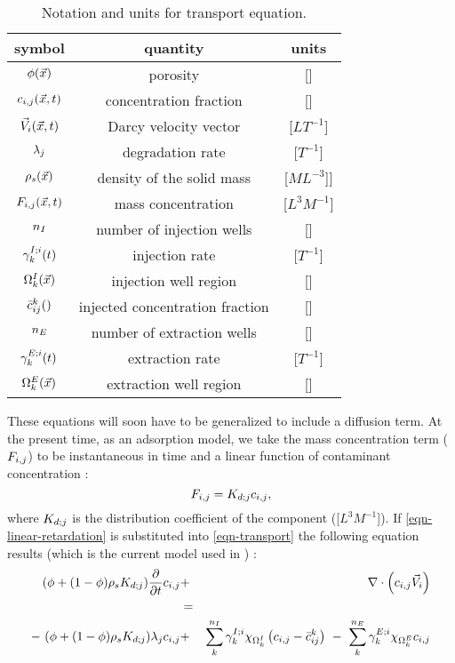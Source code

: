 \begin{table} \center
\caption{Notation and units for transport equation.}
\smallskip
\begin{tabular}{||c||c|c||}
\hline
symbol & quantity & units \\
\hline\hline
$\phi ({\vec x})$       & porosity                        & []               \\ \hline
$c_{i,j} ({\vec x},t)$     & concentration fraction          & []               \\ \hline
${\vec V}_i ({\vec x},t)$      & Darcy velocity vector           & [$L T^{-1}$]     \\ \hline
$\lambda_j$            & degradation rate                & [$T^{-1}$]       \\ \hline
$\rho_{s} ({\vec x})$  & density of the solid mass       & [$M L^{-3}$]]    \\ \hline
$F_{i,j}  ({\vec x}, t)$   & mass concentration              & [$L^{3} M^{-1}$] \\ \hline
$n_{I}$              & number of injection wells       & []               \\ \hline
$\gamma^{I;i}_{k} (t)$ & injection rate                  & [$T^{-1}$]       \\ \hline
$\Omega^{I}_{k} ({\vec x})$     & injection well region           & []               \\ \hline
${\bar c}^{k}_{ij} ()$      & injected concentration fraction & []               \\ \hline
$n_{E}$              & number of extraction wells      & []               \\ \hline
$\gamma^{E;i}_{k} (t)$ & extraction rate                 & [$T^{-1}$]       \\ \hline
$\Omega^{E}_{k} ({\vec x})$     & extraction well region          & []               \\ \hline
\end{tabular}
\label{table-transport-units}
\end{table}
These equations will soon have to be generalized to include a diffusion term.
At the present time, as an adsorption model, we take the mass concentration
term ($F_{i,j}$) to be instantaneous in time and a linear function of contaminant
concentration :
\begin{equation} \label{eqn-linear-retardation}
F_{i,j} = K_{d;j} c_{i,j},
\end{equation}
where $K_{d;j}$ is the distribution coefficient of the component
([$L^{3} M^{-1}$]).
If \ref{eqn-linear-retardation} is substituted into \ref{eqn-transport}
the following equation results (which is the current model used in \parflow{}) :
\begin{eqnarray} \label{eqn-transport2}
(\phi + (1 - \phi) \rho_{s} K_{d;j}) \frac{\partial}{\partial t} c_{i,j} & + & \nabla \cdot \left ( c_{i,j} {\vec V}_i \right ) \nonumber \\
& = & \nonumber \\
-~(\phi + (1 - \phi) \rho_{s} K_{d;j}) \lambda_j c_{i,j} & + & \sum_{k}^{n_{I}} \gamma^{I;i}_{k} \chi_{\Omega^{I}_{k}} \left ( c_{i,j} - {\bar c}^{k}_{ij} \right ) ~-~ \sum_{k}^{n_{E}} \gamma^{E;i}_{k} \chi_{\Omega^{E}_{k}} c_{i,j}
\end{eqnarray}

